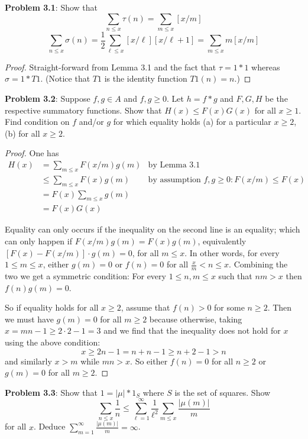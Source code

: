 \documentclass{article}
\begin{document}
\fi

\textbf{Problem 3.1}: Show that
$$\sum_{n \leq x} \tau(n) = \sum_{m \leq x} [x/m]$$
$$\sum_{n \leq x} \sigma(n) = \frac12 \sum_{\ell \leq x} [x/\ell] [x/\ell + 1] = \sum_{m \leq x} m [x/m]$$

\begin{proof}
Straight-forward from Lemma 3.1 and the fact that $\tau = 1 * 1$ whereas $\sigma = 1 * T1$. (Notice that $T1$ is the identity function $T1(n) = n$.)
\end{proof}

\textbf{Problem 3.2}: Suppose $f, g \in A$ and $f, g \geq 0$. Let $h = f * g$ and $F, G, H$ be the respective summatory functions. Show that $H(x) \leq F(x) G(x)$ for all $x \geq 1$. Find condition on $f$ and/or $g$ for which equality holds (a) for a particular $x \geq 2$, (b) for all $x \geq 2$.

\begin{proof}
One has
\begin{align*}
H(x) &= \sum_{m \leq x} F(x/m) g(m) &\text{by Lemma 3.1}\\
&\leq \sum_{m \leq x} F(x) g(m) &\text{by assumption }f, g \geq 0: F(x/m) \leq F(x)\\
&= F(x) \sum_{m \leq x} g(m)\\
&= F(x) G(x)
\end{align*}

Equality can only occurs if the inequality on the second line is an equality; which can only happen if $F(x/m) g(m) = F(x) g(m)$, equivalently $[F(x) - F(x/m)] \cdot g(m) = 0$, for all $m \leq x$. In other words, for every $1 \leq m \leq x$, either $g(m) = 0$ or $f(n) = 0$ for all $\frac{x}{m} < n \leq x$. Combining the two we get a symmetric condition: For every $1 \leq n, m \leq x$ such that $n m > x$ then $f(n) g(m) = 0$.

So if equality holds for all $x \geq 2$, assume that $f(n) > 0$ for some $n \geq 2$. Then we must have $g(m) = 0$ for all $m \geq 2$ because otherwise, taking $x = mn - 1 \geq 2 \cdot 2 - 1 = 3$ and we find that the inequality does not hold for $x$ using the above condition:
$$x \geq 2n - 1 = n + n - 1 \geq n + 2 - 1 > n$$
and similarly $x > m$ while $mn > x$. So either $f(n) = 0$ for all $n \geq 2$ or $g(m) = 0$ for all $m \geq 2$.
\end{proof}

\textbf{Problem 3.3}: Show that $1 = |\mu| * 1_S$ where $S$ is the set of squares. Show
$$\sum_{n \leq x} \frac{1}{n} \leq \sum_{\ell = 1}^{\infty} \frac{1}{\ell^2} \sum_{m \leq x} \frac{|\mu(m)|}{m}$$
for all $x$. Deduce $\sum_{m = 1}^{\infty} \frac{|\mu(m)|}{m} = \infty$.
\end{document}
